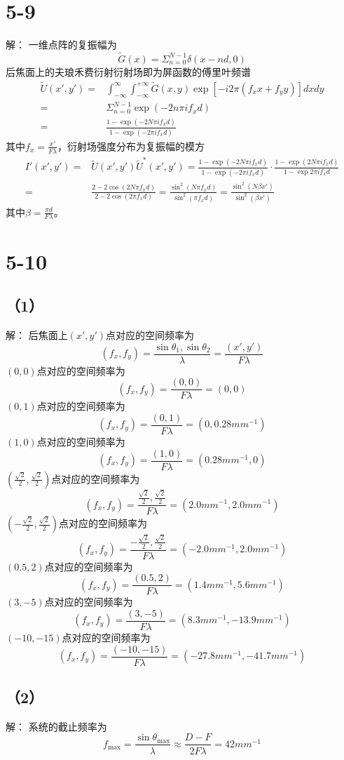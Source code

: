 \documentclass[10pt,a4paper]{article}
\begin{document}
\section*{5-9}解：
一维点阵的复振幅为
\[
\widetilde{G}(x)=\Sigma_{n=0}^{N-1}\delta(x-nd,0)
\]
后焦面上的夫琅禾费衍射衍射场即为屏函数的傅里叶频谱
\begin{align*}
\widetilde{U}(x',y')=&\int_{-\infty}^{\infty}\int_{-\infty}^{+\infty}\widetilde{G}(x,y)\exp[-i2\pi(f_xx+f_yy)]dxdy\\
=&\Sigma_{n=0}^{N-1}\exp(-2n\pi if_xd)\\
=&\frac{1-\exp(-2N\pi if_xd)}{1-\exp(-2\pi if_xd)}
\end{align*}
其中$f_x=\frac{x'}{F\lambda}$，衍射场强度分布为复振幅的模方
\begin{align*}
I'(x',y')=&\widetilde{U}(x',y')\widetilde{U}^*(x',y')=\frac{1-\exp(-2N\pi if_xd)}{1-\exp(-2\pi if_xd)}\cdot\frac{1-\exp(2N\pi if_xd)}{1-\exp{2\pi if_xd}}\\
=&\frac{2-2\cos(2N\pi f_xd)}{2-2\cos(2\pi f_xd)}=\frac{\sin^2(N\pi f_xd)}{\sin^2(\pi f_xd)}=\frac{\sin^2(N\beta x')}{\sin^2(\beta x')}
\end{align*}
其中$\beta=\frac{\pi d}{F\lambda}$。
\section*{5-10}
\subsection*{（1）}解：
后焦面上$(x',y')$点对应的空间频率为
\[
(f_x,f_y)=\frac{\sin\theta_1,\sin\theta_2}{\lambda}=\frac{(x',y')}{F\lambda}
\]
$(0,0)$点对应的空间频率为
\[
(f_x,f_y)=\frac{(0,0)}{F\lambda}=(0,0)
\]
$(0,1)$点对应的空间频率为
\[
(f_x,f_y)=\frac{(0,1)}{F\lambda}=(0,0.28mm^{-1})
\]
$(1,0)$点对应的空间频率为
\[
(f_x,f_y)=\frac{(1,0)}{F\lambda}=(0.28mm^{-1},0)
\]
$(\frac{\sqrt{2}}{2},\frac{\sqrt{2}}{2})$点对应的空间频率为
\[
(f_x,f_y)=\frac{\frac{\sqrt{2}}{2},\frac{\sqrt{2}}{2}}{F\lambda}=(2.0mm^{-1},2.0mm^{-1})
\]
$(-\frac{\sqrt{2}}{2},\frac{\sqrt{2}}{2})$点对应的空间频率为
\[
(f_x,f_y)=\frac{-\frac{\sqrt{2}}{2},\frac{\sqrt{2}}{2}}{F\lambda}=(-2.0mm^{-1},2.0mm^{-1})
\]
$(0.5,2)$点对应的空间频率为
\[
(f_x,f_y)=\frac{(0.5,2)}{F\lambda}=(1.4mm^{-1},5.6mm^{-1})
\]
$(3,-5)$点对应的空间频率为
\[
(f_x,f_y)=\frac{(3,-5)}{F\lambda}=(8.3mm^{-1},-13.9mm^{-1})
\]
$(-10,-15)$点对应的空间频率为
\[
(f_x,f_y)=\frac{(-10,-15)}{F\lambda}=(-27.8mm^{-1},-41.7mm^{-1})
\]
\subsection*{（2）}解：
系统的截止频率为
\[
f_{\max}=\frac{\sin\theta_{\max}}{\lambda}\approx\frac{D-F}{2F\lambda}=42mm^{-1}
\]
\end{document}
